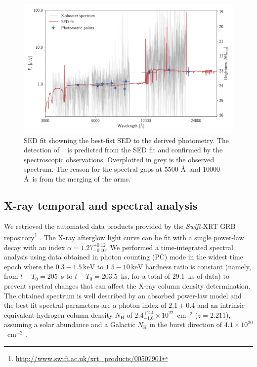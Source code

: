 \documentclass{aa}    %
\begin{document}
 \begin{figure}
	\centering
	\includegraphics[width=16cm]{figures/SEDspecphot.pdf}
	\caption{SED fit showning the best-fist SED to the derived photometry. The detection of \lya~ is predicted from the SED fit and confirmed by the spectroscopic observations. Overplotted in grey is the observed spectrum. The reason for the spectral gaps at 5500 \AA~and 10000 \AA~is from the merging of the arms.}
	\label{fig:SED}
\end{figure}

\subsection{X-ray temporal and spectral analysis}

We retrieved the automated data products provided by the \textit{Swift}-XRT GRB
repository\footnote{\url{http://www.swift.ac.uk/xrt\_products/00507901}}
\citep{Evans2009}. 
The X-ray afterglow light curve can be fit with a single power-law decay with an
index $\alpha=1.27_{-0.10}^{+0.12}$. We performed a time-integrated spectral
analysis using data obtained in photon counting (PC) mode in the widest time epoch where
the $0.3-1.5\,\mathrm{keV}$ to $1.5-10\,\mathrm{keV}$ hardness ratio is constant
(namely, from $t-T_0 = 205$~s to $t-T_0 = 203.5$~ks, for a total of 29.1~ks of
data) to prevent spectral changes that can affect the X-ray column density
determination. 
The obtained spectrum is well described by an absorbed power-law
model and the best-fit spectral parameters are a photon index of $2.1 \pm 0.4$ and
an intrinsic equivalent hydrogen column density $N_{\mathrm{H}}$ of $2.4_{-1.6}^{+2.4}
\times 10^{22}$~cm$^{-2}$ ($z=2.211$), assuming a solar abundance and a Galactic $N_{\mathrm{H}}$ in
the burst direction of $4.1 \times 10^{20}$~cm$^{-2}$ \citep{Willingale2013}.
\end{document}
